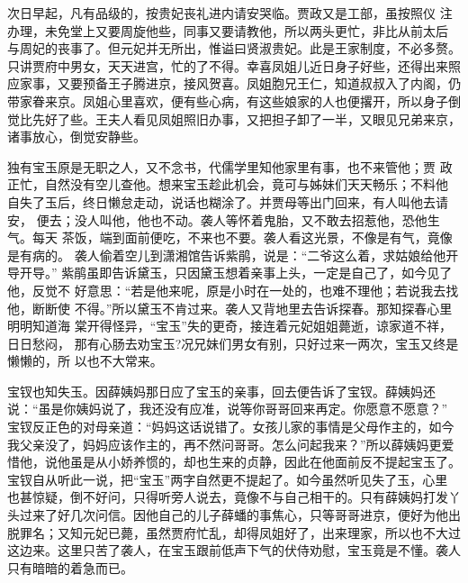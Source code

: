 次日早起，凡有品级的，按贵妃丧礼进内请安哭临。贾政又是工部，虽按照仪
注办理，未免堂上又要周旋他些，同事又要请教他，所以两头更忙，非比从前太后
与周妃的丧事了。但元妃并无所出，惟谥曰贤淑贵妃。此是王家制度，不必多赘。
只讲贾府中男女，天天进宫，忙的了不得。幸喜凤姐儿近日身子好些，还得出来照
应家事，又要预备王子腾进京，接风贺喜。凤姐胞兄王仁，知道叔叔入了内阁，仍
带家眷来京。凤姐心里喜欢，便有些心病，有这些娘家的人也便撂开，所以身子倒
觉比先好了些。王夫人看见凤姐照旧办事，又把担子卸了一半，又眼见兄弟来京，
诸事放心，倒觉安静些。

独有宝玉原是无职之人，又不念书，代儒学里知他家里有事，也不来管他；贾
政正忙，自然没有空儿查他。想来宝玉趁此机会，竟可与姊妹们天天畅乐；不料他
自失了玉后，终日懒怠走动，说话也糊涂了。并贾母等出门回来，有人叫他去请安，
便去；没人叫他，他也不动。袭人等怀着鬼胎，又不敢去招惹他，恐他生气。每天
茶饭，端到面前便吃，不来也不要。袭人看这光景，不像是有气，竟像是有病的。
袭人偷着空儿到潇湘馆告诉紫鹃，说是：“二爷这么着，求姑娘给他开导开导。”
紫鹃虽即告诉黛玉，只因黛玉想着亲事上头，一定是自己了，如今见了他，反觉不
好意思：“若是他来呢，原是小时在一处的，也难不理他；若说我去找他，断断使
不得。”所以黛玉不肯过来。袭人又背地里去告诉探春。那知探春心里明明知道海
棠开得怪异，“宝玉”失的更奇，接连着元妃姐姐薨逝，谅家道不祥，日日愁闷，
那有心肠去劝宝玉?况兄妹们男女有别，只好过来一两次，宝玉又终是懒懒的，所
以也不大常来。

宝钗也知失玉。因薛姨妈那日应了宝玉的亲事，回去便告诉了宝钗。薛姨妈还
说：“虽是你姨妈说了，我还没有应准，说等你哥哥回来再定。你愿意不愿意？”
宝钗反正色的对母亲道：“妈妈这话说错了。女孩儿家的事情是父母作主的，如今
我父亲没了，妈妈应该作主的，再不然问哥哥。怎么问起我来？”所以薛姨妈更爱
惜他，说他虽是从小娇养惯的，却也生来的贞静，因此在他面前反不提起宝玉了。
宝钗自从听此一说，把“宝玉”两字自然更不提起了。如今虽然听见失了玉，心里
也甚惊疑，倒不好问，只得听旁人说去，竟像不与自己相干的。只有薛姨妈打发丫
头过来了好几次问信。因他自己的儿子薛蟠的事焦心，只等哥哥进京，便好为他出
脱罪名；又知元妃已薨，虽然贾府忙乱，却得凤姐好了，出来理家，所以也不大过
这边来。这里只苦了袭人，在宝玉跟前低声下气的伏侍劝慰，宝玉竟是不懂。袭人
只有暗暗的着急而已。

